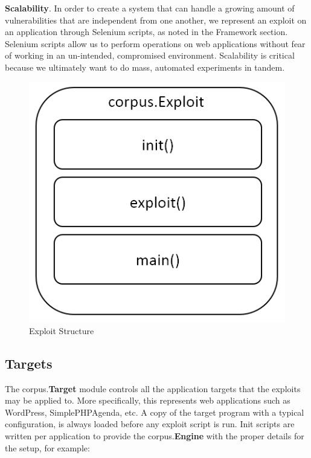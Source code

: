 \documentclass[letterpaper,twocolumn,10pt]{article}
\begin{document}
{\bf Scalability}.  In order to create a system that can handle a growing amount of vulnerabilities that are independent from one another, we represent an exploit on an application through  Selenium scripts, as noted in the Framework section.  Selenium scripts allow us to perform operations on web applications without fear of working in an un-intended, compromised environment.  Scalability is critical because we ultimately want to do mass, automated experiments in tandem. \\


\begin{figure}[!tp]
\begin{center}
\includegraphics[scale=.5]{Corpus_Exploit.PNG}
\end{center}
\caption{Exploit Structure}
\end{figure}


\subsection{Targets}

   The corpus.{\bf Target} module controls all the application targets that the exploits may be applied to.  More specifically, this represents web applications such as WordPress, SimplePHPAgenda, etc. A copy of the target program with a typical configuration, is always loaded before any exploit script is run.  Init scripts are written per application to provide the corpus.{\bf Engine} with the proper details for the setup, for example:
\end{document}
